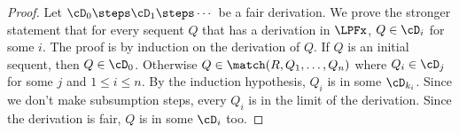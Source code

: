 
\begin{proof}
  Let $\cD_0\steps\cD_1\steps\cdots$ be a fair derivation.
  We prove the stronger statement that for every sequent $Q$ that has
  a derivation in $\LPFx$, $Q\in\cD_i$ for some $i$.  The proof is
  by induction on the derivation of $Q$.  If $Q$ is an initial sequent,
  then $Q\in\cD_0$.  Otherwise $Q\in\match(R,Q_1,\ldots,Q_n)$ where
  $Q_i\in\cD_j$ for some $j$ and $1\le i\le n$.
  By the induction hypothesis, $Q_i$ is in some $\cD_{k_i}$.  Since
  we don't make subsumption steps, every $Q_i$ is in the limit of the derivation.
  Since the derivation is fair, $Q$ is in some $\cD_i$ too.
\end{proof}
